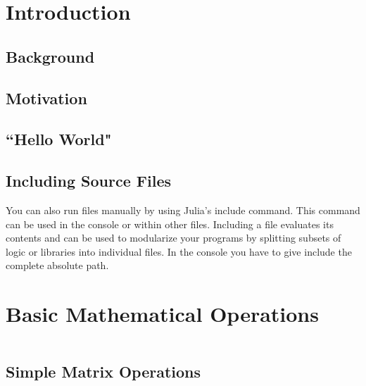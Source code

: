 
\tableofcontents
\section{Introduction}

\subsection{Background}

\subsection{Motivation}

\subsection{``Hello World"}

\subsection{Including Source Files}

You can also run files manually by using Julia's include command. This command can be used in the console or within other files. Including a file evaluates its contents and can be used to modularize your programs by splitting subsets of logic or libraries into individual files. In the console you have to give include the complete absolute path. 
\newpage
\section{Basic Mathematical Operations}

\begin{framed}
\begin{verbatim}

\end{verbatim}
\end{framed}
\subsection{Simple Matrix Operations}

\begin{framed}
\begin{verbatim}

\end{verbatim}
\end{framed}
